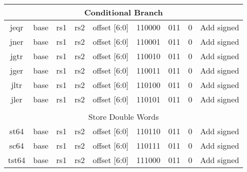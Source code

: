 \documentclass{article}
\begin{document}
\begin{center}
\begin{longtable}{|c|l|r|l|r|l|r|l|r|l|r|l|r|c|c|}
                    \multicolumn{15}{|c|}{Conditional Branch} \\    
    \hline jeqr &   \multicolumn{2}{|c|}{base}          &   \multicolumn{2}{|c|}{rs1}       &   \multicolumn{2}{|c|}{rs2}       &   \multicolumn{2}{|c|}{offset [6:0]}      &   \multicolumn{2}{|c|}{110000}    &   \multicolumn{2}{|c|}{011}       &   0       &   Add signed \\
    \hline jner &   \multicolumn{2}{|c|}{base}          &   \multicolumn{2}{|c|}{rs1}       &   \multicolumn{2}{|c|}{rs2}       &   \multicolumn{2}{|c|}{offset [6:0]}      &   \multicolumn{2}{|c|}{110001}    &   \multicolumn{2}{|c|}{011}       &   0       &   Add signed \\
    \hline jgtr &   \multicolumn{2}{|c|}{base}          &   \multicolumn{2}{|c|}{rs1}       &   \multicolumn{2}{|c|}{rs2}       &   \multicolumn{2}{|c|}{offset [6:0]}      &   \multicolumn{2}{|c|}{110010}    &   \multicolumn{2}{|c|}{011}       &   0       &   Add signed \\
    \hline jger &   \multicolumn{2}{|c|}{base}          &   \multicolumn{2}{|c|}{rs1}       &   \multicolumn{2}{|c|}{rs2}       &   \multicolumn{2}{|c|}{offset [6:0]}      &   \multicolumn{2}{|c|}{110011}    &   \multicolumn{2}{|c|}{011}       &   0       &   Add signed \\
    \hline jltr &   \multicolumn{2}{|c|}{base}          &   \multicolumn{2}{|c|}{rs1}       &   \multicolumn{2}{|c|}{rs2}       &   \multicolumn{2}{|c|}{offset [6:0]}      &   \multicolumn{2}{|c|}{110100}    &   \multicolumn{2}{|c|}{011}       &   0       &   Add signed \\
    \hline jler &   \multicolumn{2}{|c|}{base}          &   \multicolumn{2}{|c|}{rs1}       &   \multicolumn{2}{|c|}{rs2}       &   \multicolumn{2}{|c|}{offset [6:0]}      &   \multicolumn{2}{|c|}{110101}    &   \multicolumn{2}{|c|}{011}       &   0       &   Add signed \\
    
    
    \hline          \multicolumn{15}{|c|}{} \\
    
                    \multicolumn{15}{|c|}{Store Double Words} \\    
    \hline st64 &   \multicolumn{2}{|c|}{base}          &   \multicolumn{2}{|c|}{rs1}       &   \multicolumn{2}{|c|}{rs2}       &   \multicolumn{2}{|c|}{offset [6:0]}      &   \multicolumn{2}{|c|}{110110}    &   \multicolumn{2}{|c|}{011}       &   0       &   Add signed \\
    \hline sc64 &   \multicolumn{2}{|c|}{base}          &   \multicolumn{2}{|c|}{rs1}       &   \multicolumn{2}{|c|}{rs2}       &   \multicolumn{2}{|c|}{offset [6:0]}      &   \multicolumn{2}{|c|}{110111}    &   \multicolumn{2}{|c|}{011}       &   0       &   Add signed \\
    \hline tst64 &  \multicolumn{2}{|c|}{base}          &   \multicolumn{2}{|c|}{rs1}       &   \multicolumn{2}{|c|}{rs2}       &   \multicolumn{2}{|c|}{offset [6:0]}      &   \multicolumn{2}{|c|}{111000}    &   \multicolumn{2}{|c|}{011}       &   0       &   Add signed \\
        

\end{longtable}
\end{center}
\end{document}
